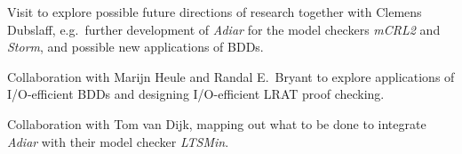 \begin{itemize}

  Visit to explore possible future directions of research together with Clemens
  Dubslaff, e.g.\ further development of \emph{Adiar} for the model checkers
  \emph{mCRL2} and \emph{Storm}, and possible new applications of BDDs.


  Collaboration with Marijn Heule and Randal E.\ Bryant to explore applications
  of I/O-efficient BDDs and designing I/O-efficient LRAT proof checking.


  Collaboration with Tom van Dijk, mapping out what to be done to integrate
  \emph{Adiar} with their model checker \emph{LTSMin}.
\end{itemize}

